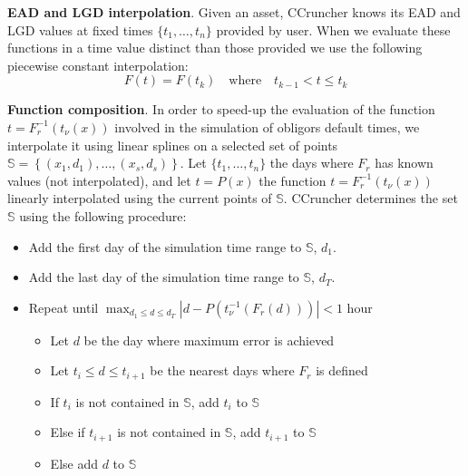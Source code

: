 \documentclass[11pt,fleqn]{book} %
\begin{document}
\textbf{EAD and LGD interpolation}. Given an asset, CCruncher knows its EAD 
and LGD values at fixed times $\{t_1,\dots,t_n\}$ provided by user. When 
we evaluate these functions in a time value distinct than those provided we 
use the following piecewise constant interpolation:
\begin{displaymath}
	F(t) = F(t_k) \quad \text{where} \quad t_{k-1} < t \le t_{k}
\end{displaymath}

\textbf{Function composition}. In order to speed-up the evaluation of the
function $t=F_r^{-1}(t_{\nu}(x))$ involved in the simulation of obligors 
default times, we interpolate it using linear splines on a selected set of 
points $\mathbb{S} = \left\{(x_1,d_1),\dots,(x_s,d_s)\right\}$. 
Let $\{t_1,\dots,t_n\}$ the days where $F_r$ has known values (not 
interpolated), and let $t=P(x)$ the function $t=F_r^{-1}(t_{\nu}(x))$ 
linearly interpolated using the current points of $\mathbb{S}$. 
CCruncher determines the set $\mathbb{S}$ using the following procedure:
\begin{itemize}
	\item Add the first day of the simulation time range to $\mathbb{S}$, $d_1$.
	\item Add the last day of the simulation time range to $\mathbb{S}$, $d_T$.
	\item Repeat until $\displaystyle \max_{d_1 \le d \le d_T}\left|d - P(t_{\nu}^{-1}(F_r(d)))\right| < 1$ hour
	\begin{itemize}
		\item Let $d$ be the day where maximum error is achieved
		\item Let $t_i \le d \le t_{i+1}$ be the nearest days where $F_r$ is defined
		\item If $t_i$ is not contained in $\mathbb{S}$, add $t_i$ to $\mathbb{S}$
		\item Else if $t_{i+1}$ is not contained in $\mathbb{S}$, add $t_{i+1}$ to $\mathbb{S}$
		\item Else add $d$ to $\mathbb{S}$
	\end{itemize}
\end{itemize}
\end{document}
